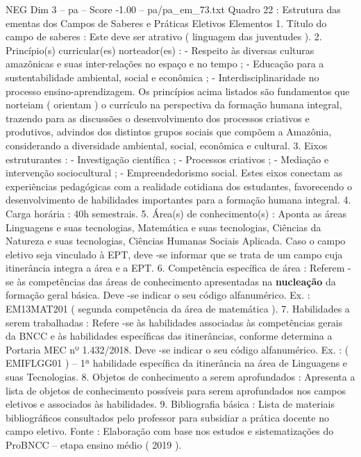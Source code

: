 \begin{textsample}{NEG Dim 3 – pa – Score -1.00 – pa/pa\_em\_73.txt}  \label{ex:f3_neg_054}
Quadro 22 : Estrutura das ementas dos Campos de Saberes e Práticas Eletivos Elementos 1.
Título do campo de saberes : Este deve ser atrativo ( linguagem das juventudes ). 2.
Princípio(s) curricular(es) norteador(es) : - Respeito às diversas culturas amazônicas e suas inter-relações no espaço e no tempo ; - Educação para a sustentabilidade ambiental, social e econômica ; - Interdisciplinaridade no processo ensino-aprendizagem.
Os princípios acima listados são fundamentos que norteiam ( orientam ) o currículo na perspectiva da formação humana integral, trazendo para as discussões o desenvolvimento dos processos criativos e produtivos, advindos dos distintos grupos sociais que compõem a Amazônia, considerando a diversidade ambiental, social, econômica e cultural. 3.
Eixos estruturantes : - Investigação científica ; - Processos criativos ; - Mediação e intervenção sociocultural ; - Empreendedorismo social.
Estes eixos conectam as experiências pedagógicas com a realidade cotidiana dos estudantes, favorecendo o desenvolvimento de habilidades importantes para a formação humana integral. 4.
Carga horária : 40h semestrais. 5.
Área(s) de conhecimento(s) : Aponta as áreas Linguagens e suas tecnologias, Matemática e suas tecnologias, Ciências da Natureza e suas tecnologias, Ciências Humanas Sociais Aplicada.
Caso o campo eletivo seja vinculado à EPT, deve -se informar que se trata de um campo cuja itinerância integra a área e a EPT. 6.
Competência específica de área : Referem -se às competências das áreas de conhecimento apresentadas na \textbf{nucleação} da formação geral básica.
Deve -se indicar o seu código alfanumérico.
Ex. : EM13MAT201 ( segunda competência da área de matemática ). 7.
Habilidades a serem trabalhadas : Refere -se às habilidades associadas às competências gerais da BNCC e às habilidades específicas das itinerâncias, conforme determina a Portaria MEC nº 1.432/2018.
Deve -se indicar o seu código alfanumérico.
Ex. : ( EMIFLGG01 ) – 1ª habilidade específica da itinerância na área de Linguagens e suas Tecnologias. 8.
Objetos de conhecimento a serem aprofundados : Apresenta a lista de objetos de conhecimento possíveis para serem aprofundados nos campos eletivos e associados às habilidades. 9.
Bibliografia básica : Lista de materiais bibliográficos consultados pelo professor para subsidiar a prática docente no campo eletivo.
Fonte : Elaboração com base nos estudos e sistematizações do ProBNCC – etapa ensino médio ( 2019 ).

\end{textsample}

